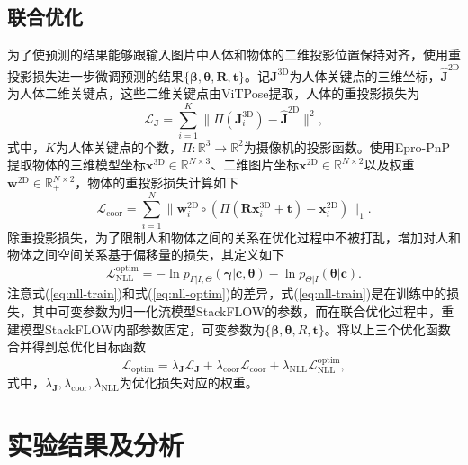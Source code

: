 \subsection{联合优化}
为了使预测的结果能够跟输入图片中人体和物体的二维投影位置保持对齐，使用重投影损失进一步微调预测的结果$\{\mathbf{\beta}, \mathbf{\theta}, \mathbf{R}, \mathbf{t}\}$。记$\mathbf{J}^{\text{3D}}$为人体关键点的三维坐标，$\hat{\mathbf{J}}^{\text{2D}}$为人体二维关键点，这些二维关键点由ViTPose\citep{NEURIPS2022_fbb10d31}提取，人体的重投影损失为
\begin{equation}\label{eq:joint_loss}
	\mathcal{L}_{\mathbf{J}} = \sum_{i=1}^K \| \Pi(\mathbf{J}_i^{\text{3D}}) - \hat{\mathbf{J}}^{\text{2D}} \|^2,
\end{equation}
式中，$K$为人体关键点的个数，$\Pi: \mathbb{R}^3 \to \mathbb{R}^2$为摄像机的投影函数。使用Epro-PnP\citep{Chen_2022_CVPR:epro_pnp}提取物体的三维模型坐标$\mathbf{x}^{\text{3D}}\in \mathbb{R}^{N\times 3}$、二维图片坐标$\mathbf{x}^{\text{2D}}\in\mathbb{R}^{N \times 2}$以及权重$\mathbf{w}^{\text{2D}}\in \mathbb{R}_+^{N\times 2}$，物体的重投影损失计算如下
\begin{equation}\label{eq:coor_reprojection}
	\mathcal{L}_{\text{coor}} = \sum_{i=1}^N \| \mathbf{w}_i^{\text{2D}} \circ (\Pi(\mathbf{R}\mathbf{x}_i^{\text{3D}} + \mathbf{t}) - \mathbf{x}_i^{\text{2D}}) \|_1.
\end{equation}
除重投影损失，为了限制人和物体之间的关系在优化过程中不被打乱，增加对人和物体之间空间关系基于偏移量的损失，其定义如下
\begin{equation}\label{eq:nll-optim}
	\mathcal{L}_{\text{NLL}}^{\text{optim}} = - \ln p_{\Gamma|I,\Theta}(\mathbf{\gamma}|\mathbf{c}, \mathbf{\theta}) - \ln p_{\Theta|I}(\mathbf{\theta}|\mathbf{c}).
\end{equation}
注意式(\ref{eq:nll-train})和式(\ref{eq:nll-optim})的差异，式(\ref{eq:nll-train})是在训练中的损失，其中可变参数为归一化流模型StackFLOW的参数，而在联合优化过程中，重建模型StackFLOW内部参数固定，可变参数为$\{\mathbf{\beta}, \mathbf{\theta}, R, \mathbf{t}\}$。将以上三个优化函数合并得到总优化目标函数
\begin{equation}
	\mathcal{L}_{\text{optim}} = \lambda_{\mathbf{J}} \mathcal{L}_{\mathbf{J}} + \lambda_{\text{coor}} \mathcal{L}_{\text{coor}} + \lambda_{\text{NLL}} \mathcal{L}_{\text{NLL}}^{\text{optim}},
\end{equation}
式中，$\lambda_{\mathbf{J}},\lambda_{\text{coor}},\lambda_{\text{NLL}}$为优化损失对应的权重。

\section{实验结果及分析}\label{sec:exp-stackflow}

